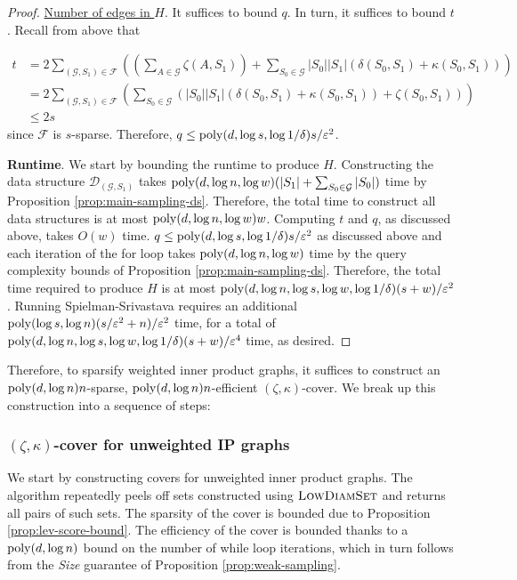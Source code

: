 \begin{proof}
\underline{Number of edges in $H$}. It suffices to bound $q$. In turn, it suffices to bound $t$. Recall from above that

\begin{align*}
t &= 2\sum_{(\mathcal G,S_1)\in \mathcal F} \left(\left(\sum_{A\in \mathcal G} \zeta(A,S_1)\right) + \sum_{S_0\in \mathcal G} |S_0||S_1|(\delta(S_0,S_1) + \kappa(S_0,S_1))\right)\\
&= 2\sum_{(\mathcal G,S_1)\in \mathcal F} \left(\sum_{S_0\in \mathcal G} \left(|S_0||S_1|(\delta(S_0,S_1) + \kappa(S_0,S_1)) + \zeta(S_0,S_1)\right)\right)\\
&\le 2s
\end{align*}
since $\mathcal F$ is $s$-sparse. Therefore, $q\le \mathrm{poly}(d,\log s,\log 1/\delta) s/\varepsilon^2$.

\textbf{Runtime}. We start by bounding the runtime to produce $H$. Constructing the data structure $\mathcal D_{(\mathcal G,S_1)}$ takes $\mathrm{poly}(d,\log n,\log w) (|S_1| + \sum_{S_0\in \mathcal G} |S_0|)$ time by Proposition \ref{prop:main-sampling-ds}. Therefore, the total time to construct all data structures is at most $\mathrm{poly}(d,\log n,\log w) w$. Computing $t$ and $q$, as discussed above, takes $O(w)$ time. $q\le \mathrm{poly}(d,\log s,\log 1/\delta) s/\varepsilon^2$ as discussed above and each iteration of the for loop takes $\mathrm{poly}(d,\log n,\log w)$ time by the query complexity bounds of Proposition \ref{prop:main-sampling-ds}. Therefore, the total time required to produce $H$ is at most $\mathrm{poly}(d,\log n,\log s,\log w,\log 1/\delta) (s + w)/\varepsilon^2$. Running Spielman-Srivastava requires an additional $\mathrm{poly}(\log s,\log n) (s/\varepsilon^2 + n)/\varepsilon^2$ time, for a total of $\mathrm{poly}(d,\log n,\log s,\log w,\log 1/\delta) (s + w)/\varepsilon^4$ time, as desired.
\end{proof}

Therefore, to sparsify weighted inner product graphs, it suffices to construct an $\mathrm{poly}(d,\log n) n$-sparse, $\mathrm{poly}(d,\log n) n$-efficient $(\zeta,\kappa)$-cover. We break up this construction into a sequence of steps:

\subsubsection{\texorpdfstring{$(\zeta,\kappa)$}{}-cover for unweighted IP graphs}

We start by constructing covers for unweighted inner product graphs. The algorithm repeatedly peels off sets constructed using $\textsc{LowDiamSet}$ and returns all pairs of such sets. The sparsity of the cover is bounded due to Proposition \ref{prop:lev-score-bound}. The efficiency of the cover is bounded thanks to a $\mathrm{poly}(d,\log n)$ bound on the number of while loop iterations, which in turn follows from the \emph{Size} guarantee of Proposition \ref{prop:weak-sampling}.

